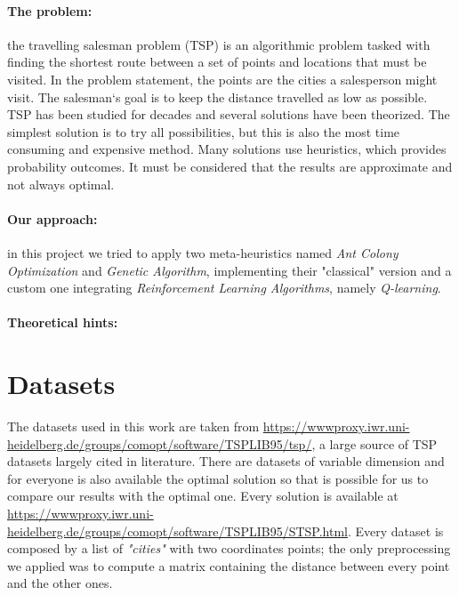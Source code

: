 \paragraph{The problem:}
the travelling salesman problem (TSP) is an algorithmic problem tasked with finding the shortest route between a set of points and locations that must be visited. 
In the problem statement, the points are the cities a salesperson might visit. The salesman‘s goal is to keep the distance travelled as low as possible. 
TSP has been studied for decades and several solutions have been theorized. 
The simplest solution is to try all possibilities, but this is also the most time consuming and expensive method. 
Many solutions use heuristics, which provides probability outcomes. 
It must be considered that the results are approximate and not always optimal. 
\paragraph{Our approach:}
in this project we tried to apply two meta-heuristics named \textit{Ant Colony Optimization} and \textit{Genetic Algorithm}, implementing their "classical" version and a custom one integrating \textit{Reinforcement Learning Algorithms}, namely \textit{Q-learning}.
\paragraph{Theoretical hints:}

\section{Datasets}
The datasets used in this work are taken from  \url{https://wwwproxy.iwr.uni-heidelberg.de/groups/comopt/software/TSPLIB95/tsp/}, a large source of TSP datasets largely cited in literature. 
There are datasets of variable dimension and for everyone is also available the optimal solution so that is possible for us to compare our results with the optimal one.
Every solution is available at \url{https://wwwproxy.iwr.uni-heidelberg.de/groups/comopt/software/TSPLIB95/STSP.html}.
Every dataset is composed by a list of \textit{"cities"} with two coordinates points; the only preprocessing we applied was to compute a matrix containing the distance between every point and the other ones.
